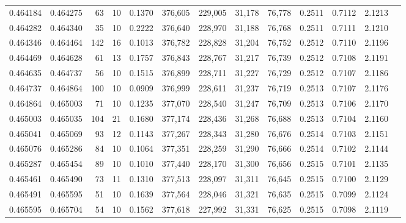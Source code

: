 \begin{tabular}{rrrrrrrrrrrrr}
0.464184 & 0.464275 &    63 &  10 &                                     0.1370 & 376,605 & 229,005 &  31,178 &  76,778 & 0.2511 & 0.7112 & 2.1213 \\
0.464282 & 0.464340 &    35 &  10 &                                     0.2222 & 376,640 & 228,970 &  31,188 &  76,768 & 0.2511 & 0.7111 & 2.1210 \\
0.464346 & 0.464464 &   142 &  16 &                                     0.1013 & 376,782 & 228,828 &  31,204 &  76,752 & 0.2512 & 0.7110 & 2.1196 \\
0.464469 & 0.464628 &    61 &  13 &                                     0.1757 & 376,843 & 228,767 &  31,217 &  76,739 & 0.2512 & 0.7108 & 2.1191 \\
0.464635 & 0.464737 &    56 &  10 &                                     0.1515 & 376,899 & 228,711 &  31,227 &  76,729 & 0.2512 & 0.7107 & 2.1186 \\
0.464737 & 0.464864 &   100 &  10 &                                     0.0909 & 376,999 & 228,611 &  31,237 &  76,719 & 0.2513 & 0.7107 & 2.1176 \\
0.464864 & 0.465003 &    71 &  10 &                                     0.1235 & 377,070 & 228,540 &  31,247 &  76,709 & 0.2513 & 0.7106 & 2.1170 \\
0.465003 & 0.465035 &   104 &  21 &                                     0.1680 & 377,174 & 228,436 &  31,268 &  76,688 & 0.2513 & 0.7104 & 2.1160 \\
0.465041 & 0.465069 &    93 &  12 &                                     0.1143 & 377,267 & 228,343 &  31,280 &  76,676 & 0.2514 & 0.7103 & 2.1151 \\
0.465076 & 0.465286 &    84 &  10 &                                     0.1064 & 377,351 & 228,259 &  31,290 &  76,666 & 0.2514 & 0.7102 & 2.1144 \\
0.465287 & 0.465454 &    89 &  10 &                                     0.1010 & 377,440 & 228,170 &  31,300 &  76,656 & 0.2515 & 0.7101 & 2.1135 \\
0.465461 & 0.465490 &    73 &  11 &                                     0.1310 & 377,513 & 228,097 &  31,311 &  76,645 & 0.2515 & 0.7100 & 2.1129 \\
0.465491 & 0.465595 &    51 &  10 &                                     0.1639 & 377,564 & 228,046 &  31,321 &  76,635 & 0.2515 & 0.7099 & 2.1124 \\
0.465595 & 0.465704 &    54 &  10 &                                     0.1562 & 377,618 & 227,992 &  31,331 &  76,625 & 0.2515 & 0.7098 & 2.1119 \\

\end{tabular}

